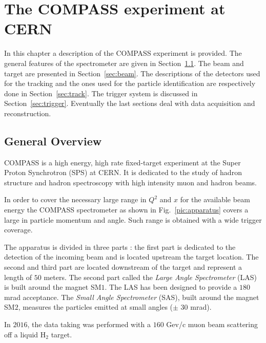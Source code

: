 
\chapter{The COMPASS experiment at CERN} %

\label{ch:exp} %

In this chapter a description of the COMPASS experiment is provided. The general features of the spectrometer are given in Section~\ref{sec:specgen}. The beam and target are presented in Section~\ref{sec:beam}. The descriptions of the detectors used for the tracking and the ones used for the particle identification are respectively done in Section~\ref{sec:track}. The trigger system is discussed in Section~\ref{sec:trigger}. Eventually the last sections deal with data acquisition and reconstruction.


\section{General Overview}\label{sec:specgen}

COMPASS is a high energy, high rate fixed-target experiment at the Super Proton Synchrotron (SPS) at CERN. It is dedicated to the study of hadron structure and hadron spectroscopy with high intensity muon and hadron beams.

In order to cover the necessary large range in $Q^2$ and $x$ for the available beam energy the COMPASS spectrometer as shown in Fig.~\ref{pic:apparatus} covers a large in particle momentum and angle. Such range is obtained with a wide trigger coverage.

The apparatus is divided in three parts : the first part is dedicated to the detection of the incoming beam and is located upstream the target location. The second and third part are located downstream of the target and represent a length of $50$ meters. The second part called the \textit{Large Angle Spectrometer} (LAS) is built around the magnet SM$1$.
The LAS has been designed to provide a $180$ mrad acceptance. The \textit{Small Angle Spectrometer} (SAS), built around the magnet SM$2$, measures the particles emitted at small angles ($\pm$ $30$ mrad).

In $2016$, the data taking was performed with a $160$ Gev/c muon beam scattering off a liquid H$_2$ target.

